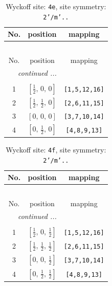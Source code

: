 \documentclass[fleqn,8pt]{jsarticle}
\begin{document}
\begin{longtable}{ccc}
\caption{Wyckoff site: {\tt 4e}, site symmetry: {\tt 2'/m'..}}
 \\
 \hline \hline
No. & position & mapping \\ \hline \endfirsthead

\multicolumn{2}{l}{\tablename\ \thetable{}} \\
 \hline \hline
No. & position & mapping \\ \hline \endhead

 \hline \hline
\multicolumn{2}{r}{\footnotesize\it continued ...} \\ \endfoot

 \hline \hline
\multicolumn{2}{r}{} \\ \endlastfoot

1 & $\left[ \frac{1}{2},\, 0,\, 0 \right]$ & {\tt [1,5,12,16]} \\ \hline
2 & $\left[ \frac{1}{2},\, \frac{1}{2},\, 0 \right]$ & {\tt [2,6,11,15]} \\ \hline
3 & $\left[ 0,\, 0,\, 0 \right]$ & {\tt [3,7,10,14]} \\ \hline
4 & $\left[ 0,\, \frac{1}{2},\, 0 \right]$ & {\tt [4,8,9,13]} \\
\end{longtable}
\renewcommand{\arraystretch}{1.2}
\begin{longtable}{ccc}
\caption{Wyckoff site: {\tt 4f}, site symmetry: {\tt 2'/m'..}}
 \\
 \hline \hline
No. & position & mapping \\ \hline \endfirsthead

\multicolumn{2}{l}{\tablename\ \thetable{}} \\
 \hline \hline
No. & position & mapping \\ \hline \endhead

 \hline \hline
\multicolumn{2}{r}{\footnotesize\it continued ...} \\ \endfoot

 \hline \hline
\multicolumn{2}{r}{} \\ \endlastfoot

1 & $\left[ \frac{1}{2},\, 0,\, \frac{1}{2} \right]$ & {\tt [1,5,12,16]} \\ \hline
2 & $\left[ \frac{1}{2},\, \frac{1}{2},\, \frac{1}{2} \right]$ & {\tt [2,6,11,15]} \\ \hline
3 & $\left[ 0,\, 0,\, \frac{1}{2} \right]$ & {\tt [3,7,10,14]} \\ \hline
4 & $\left[ 0,\, \frac{1}{2},\, \frac{1}{2} \right]$ & {\tt [4,8,9,13]} \\
\end{longtable}
\end{document}
